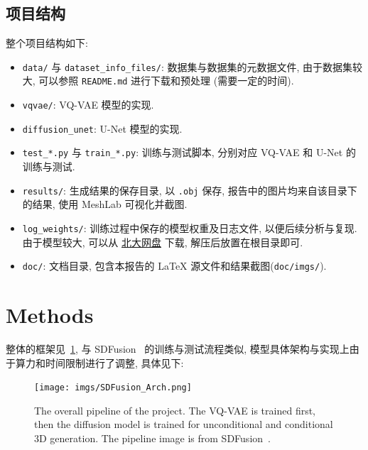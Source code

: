 \documentclass[11pt]{article}
\newcommand\1{\mathds{1}}
\begin{document}
\subsection{项目结构}
整个项目结构如下:
\begin{itemize}
    \item \texttt{data/} 与 \texttt{dataset\_info\_files/}: 数据集与数据集的元数据文件, 由于数据集较大, 可以参照 \texttt{README.md} 进行下载和预处理 (需要一定的时间).
    \item \texttt{vqvae/}: VQ-VAE 模型的实现.
    \item \texttt{diffusion\_unet}: U-Net 模型的实现.
    \item \texttt{test\_*.py} 与 \texttt{train\_*.py}: 训练与测试脚本, 分别对应 VQ-VAE 和 U-Net 的训练与测试.
    \item \texttt{results/}: 生成结果的保存目录, 以 \texttt{.obj} 保存, 报告中的图片均来自该目录下的结果, 使用 MeshLab 可视化并截图.
    \item \texttt{log\_weights/}: 训练过程中保存的模型权重及日志文件, 以便后续分析与复现. 由于模型较大, 可以从 \href{https://disk.pku.edu.cn/link/AA3B115F519B354D259577EF3575C34B2A}{北大网盘} 下载, 解压后放置在根目录即可. 
    \item \texttt{doc/}: 文档目录, 包含本报告的 LaTeX 源文件和结果截图(\texttt{doc/imgs/}).
\end{itemize}

\section{Methods}
整体的框架见~\cref{fig:pipeline}, 与 SDFusion~\cite{cheng2023sdfusion} 的训练与测试流程类似, 模型具体架构与实现上由于算力和时间限制进行了调整, 具体见下:

\begin{figure}[htbp]
    \centering
    \texttt{[image: imgs/SDFusion\_Arch.png]}
    \caption{The overall pipeline of the project. The VQ-VAE is trained first, then the diffusion model is trained for unconditional and conditional 3D generation. The pipeline image is from SDFusion~\cite{cheng2023sdfusion}.}
    \label{fig:pipeline}
\end{figure}
\end{document}
